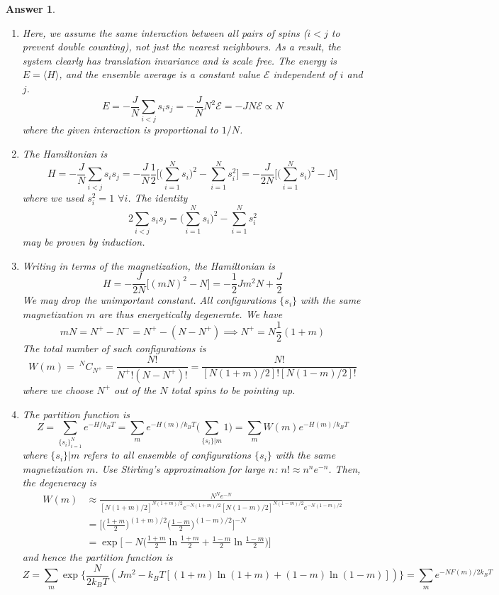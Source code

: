 \documentclass[a4paper]{article}
\newtheorem{ans}{Answer}[section]
\theoremstyle{new}
\begin{document}
\begin{ans}\leavevmode
\begin{enumerate}[label=(\alph*)]
\item Here, we assume the same interaction between all pairs of spins ($i<j$ to prevent double counting), not just the nearest neighbours. As a result, the system clearly has translation invariance and is scale free. The energy is $E=\langle H\rangle$, and the ensemble average is a constant value $\mathcal{E}$ independent of $i$ and $j$.
$$E=-\frac{J}{N}\sum_{i<j}s_is_j=-\frac{J}{N}N^2\mathcal{E}=-JN\mathcal{E}\propto N$$
where the given interaction is proportional to $1/N$.
\item The Hamiltonian is
$$H=-\frac{J}{N}\sum_{i<j}s_is_j=-\frac{J}{N}\frac{1}{2}\bigg[\bigg(\sum_{i=1}^Ns_i\bigg)^2-\sum_{i=1}^Ns_i^2\bigg]=-\frac{J}{2N}\bigg[\bigg(\sum_{i=1}^Ns_i\bigg)^2-N\bigg]$$
where we used $s_i^2=1$ $\forall i$. The identity
$$2\sum_{i<j}s_is_j=\bigg(\sum_{i=1}^Ns_i\bigg)^2-\sum_{i=1}^Ns_i^2$$
may be proven by induction.
\item Writing in terms of the magnetization, the Hamiltonian is
$$H=-\frac{J}{2N}\bigg[(mN)^2-N\bigg]=-\frac{1}{2}Jm^2N+\frac{J}{2}$$
We may drop the unimportant constant. All configurations $\{s_i\}$ with the same magnetization $m$ are thus energetically degenerate. We have
$$mN=N^+-N^-=N^+-(N-N^+)\implies N^+=N\frac{1}{2}(1+m)$$
The total number of such configurations is
$$W(m)=~^NC_{N^+}=\frac{N!}{N^+!(N-N^+)!}=\frac{N!}{[N(1+m)/2]![N(1-m)/2]!}$$
where we choose $N^+$ out of the $N$ total spins to be pointing up. 
\item The partition function is
$$Z=\sum_{\{s_i\}_{i=1}^N}e^{-H/k_BT}=\sum_me^{-H(m)/k_BT}\bigg(\sum_{\{s_i\}|m}1\bigg)=\sum_m W(m)e^{-H(m)/k_BT}$$
where $\{s_i\}|m$ refers to all ensemble of configurations $\{s_i\}$ with the same magnetization $m$. Use Stirling's approximation for large $n$: $n!\approx n^ne^{-n}$. Then, the degeneracy is 
\begin{align}
W(m)&\approx\frac{N^Ne^{-N}}{[N(1+m)/2]^{N(1+m)/2}e^{-N(1+m)/2}[N(1-m)/2]^{N(1-m)/2}e^{-N(1-m)/2}}\nonumber\\&=\bigg[\bigg(\frac{1+m}{2}\bigg)^{(1+m)/2}\bigg(\frac{1-m}{2}\bigg)^{(1-m)/2}\bigg]^{-N}\nonumber\\&=\exp\bigg[-N\bigg(\frac{1+m}{2}\ln\frac{1+m}{2}+\frac{1-m}{2}\ln\frac{1-m}{2}\bigg)\bigg]\nonumber
\end{align}
and hence the partition function is 
$$Z=\sum_m\exp\bigg\{\frac{N}{2k_BT}(Jm^2-k_BT[(1+m)\ln(1+m)+(1-m)\ln(1-m)])\bigg\}=\sum_me^{-NF(m)/2k_BT}$$

\end{enumerate}
\end{ans}
\end{document}
